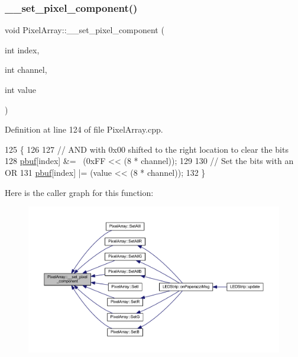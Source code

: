 \subsubsection{\texorpdfstring{\+\_\+\+\_\+set\+\_\+pixel\+\_\+component()}{\_\_set\_pixel\_component()}}
{\footnotesize\ttfamily void Pixel\+Array\+::\+\_\+\+\_\+set\+\_\+pixel\+\_\+component (\begin{DoxyParamCaption}\item[{int}]{index,  }\item[{int}]{channel,  }\item[{int}]{value }\end{DoxyParamCaption})\hspace{0.3cm}{\ttfamily [private]}}



Definition at line 124 of file Pixel\+Array.\+cpp.


\begin{DoxyCode}
125 \{
126 
127     \textcolor{comment}{// AND with 0x00 shifted to the right location to clear the bits}
128     \hyperlink{class_pixel_array_ab0109a336e69a9942b2723e43ee715d7}{pbuf}[index] &= ~(0xFF << (8 * channel));
129 
130     \textcolor{comment}{// Set the bits with an OR}
131     \hyperlink{class_pixel_array_ab0109a336e69a9942b2723e43ee715d7}{pbuf}[index] |= (value << (8 * channel));
132 \}
\end{DoxyCode}
Here is the caller graph for this function\+:\nopagebreak
\begin{figure}[H]
\begin{center}
\leavevmode
\includegraphics[width=350pt]{class_pixel_array_a42c6681bf771332826ecc9ad2a8cea02_icgraph}
\end{center}
\end{figure}
\mbox{\label{class_pixel_array_a987f1dc053a5cf25d78d5cfe037088d3}} 
